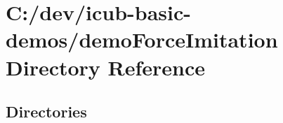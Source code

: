 \section{C\+:/dev/icub-\/basic-\/demos/demo\+Force\+Imitation Directory Reference}
\label{dir_5ec8fd5ae47fc4cf5bf3f1d9d508f559}
\subsection*{Directories}
\begin{DoxyCompactItemize}
\end{DoxyCompactItemize}
